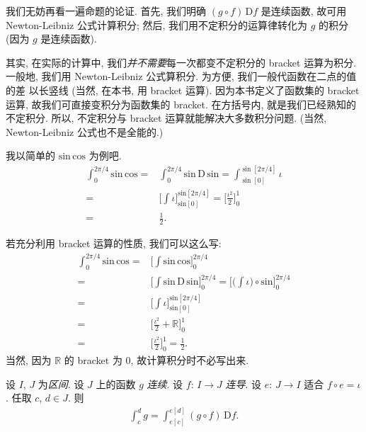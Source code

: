 我们无妨再看一遍命题的论证.
首先, 我们明确 $(g \circ f)\,\mathrm{D}f$ 是连续函数,
故可用 Newton-Leibniz 公式计算积分;
然后, 我们用不定积分的运算律转化为 $g$ 的积分
(因为 $g$ 是连续函数).

其实, 在实际的计算中,
我们\emph{并不需要}每一次都变不定积分的 bracket 运算为积分.
一般地, 我们用 Newton-Leibniz 公式算积分.
为方便, 我们一般代函数在二点的值的差
以长竖线 (当然, 在本书, 用 bracket 运算).
因为本书定义了函数集的 bracket 运算,
故我们可直接变积分为函数集的 bracket.
在方括号内, 就是我们已经熟知的不定积分.
所以, 不定积分与 bracket 运算就能解决大多数积分问题.
(当然, Newton-Leibniz 公式也不是全能的.)

\begin{example}
    我以简单的 $\mathrm{sin}\, \mathrm{cos}$ 为例吧.
    \begin{align*}
        \int_{0}^{2\pi/4} {\mathrm{sin}\,\mathrm{cos}}
        = {} & \int_{0}^{2\pi/4} {\mathrm{sin}\,\mathrm{D}\,\mathrm{sin}}
        = \int_{\sin[0]}^{\sin[2\pi/4]} {\iota}                                    \\
        = {} & \Bigg[ \int {\iota} \Bigg]_{\mathrm{sin}[0]}^{\mathrm{sin}[2\pi/4]}
        = \Bigg[ \frac{\iota^2}{2} \Bigg]_{0}^{1}                                  \\
        = {} & \frac{1}{2}.
    \end{align*}

    若充分利用 bracket 运算的性质, 我们可以这么写:
    \begin{align*}
        \int_{0}^{2\pi/4} {\mathrm{sin}\,\mathrm{cos}}
        = {} & \Bigg[ \int {\mathrm{sin}\,\mathrm{cos}} \Bigg]_{0}^{2\pi/4}             \\
        = {} & \Bigg[ \int {\mathrm{sin}\,\mathrm{D}\,\mathrm{sin}} \Bigg]_{0}^{2\pi/4}
        = \Bigg[ \Bigg( \int {\iota} \Bigg) \circ \mathrm{sin} \Bigg]_{0}^{2\pi/4}      \\
        = {} & \Bigg[ \int {\iota} \Bigg]_{\mathrm{sin}[0]}^{\mathrm{sin}[2\pi/4]}      \\
        = {} & \Bigg[ \frac{\iota^2}{2} + \mathbb{R} \Bigg]_{0}^{1}                     \\
        = {} & \Bigg[ \frac{\iota^2}{2} \Bigg]_{0}^{1}
        = \frac{1}{2}.
    \end{align*}
    当然, 因为 $\mathbb{R}$ 的 bracket 为 $0$,
    故计算积分时不必写出来.
\end{example}

\begin{theorem}
    设 $I$, $J$ 为\emph{区间}.
    设 $J$ 上的函数 $g$ \emph{连续}.
    设 $f$: $I \to J$ \emph{连导}.
    设 $e$: $J \to I$ 适合 $f \circ e = \iota$.
    任取 $c$, $d \in J$.
    则
    \begin{align*}
        \int_{c}^{d} {g} = \int_{e[c]}^{e[d]} {(g \circ f)\,\mathrm{D}f}.
    \end{align*}
\end{theorem}


